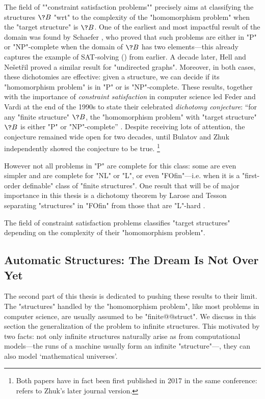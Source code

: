 The field of \AP""constraint satisfaction problems"" precisely aims at classifying the
structures $\?B$ "wrt" to the complexity of the "homomorphism problem" when the
"target structure" is $\?B$. One of the earliest and most impactful result
of the domain was found by Schaefer \cite{Schaefer1978ComplexitySatisfiability},
who proved that such problems are either in "P" or "NP"-complete when the domain of $\?B$
has two elements---this already captures the example of SAT-solving () from earlier.
A decade later, Hell and Ne\v{s}et\v{r}il \cite{HellNesetril1990ComplexityColoring}
proved a similar result for "undirected graphs".
Moreover, in both cases, these dichotomies are effective: given a structure, we can decide if
its "homomorphism problem" is in "P" or is "NP"-complete.
These results, together with the importance of \emph{constraint satisfaction} in computer science
led Feder and Vardi at the end of the 1990s
to state their celebrated \emph{dichotomy conjecture}: ``for any "finite structure" $\?B$,
the "homomorphism problem" with "target structure" $\?B$ is either "P"
or "NP"-complete'' \cite{FederVardi1998ComputationalStructure}.
Despite receiving lots of attention, the conjecture remained wide open for two decades, until
Bulatov \cite{Bulatov2017DichotomyCSPs} and Zhuk \cite{Zhuk2020CSPDichotomy} independently
showed the conjecture to be true.%
\footnote{Both papers have in fact been first published in 2017 in the same conference:
\cite{Zhuk2020CSPDichotomy} refers to Zhuk's later journal version.}

However not all problems in "P" are complete for this class: some are even simpler and are complete
for "NL" or "L", or even "FOfin"---i.e. when it is a "first-order definable" class of "finite structures".
One result that will be of major importance in this thesis is a dichotomy
theorem by Larose and Tesson separating "structures" in "FOfin" from those that are "L"-hard
\cite{LaroseTesson2009UniversalAlgebraCSP}.

\begin{known}
	The field of constraint satisfaction problems classifies "target structures"
	depending on the complexity of their "homomorphism problem".
\end{known}

\subsection{Automatic Structures: The Dream Is Not Over Yet}

The second part of this thesis is dedicated to pushing these results to their limit.
The "structures" handled by the "homomorphism problem", like most
problems in computer science, are usually assumed to be "finite@@struct".
We discuss in this section the generalization of the problem to
infinite structures. This motivated by two facts: not only infinite structures
naturally arise as from computational models---the runs of a machine
usually form an infinite "structure"---, they can also model `mathematical universes'.

